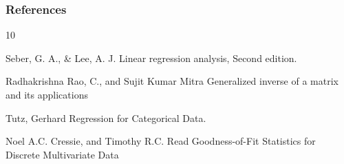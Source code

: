 \documentclass{beamer}
\begin{document}
\begin{frame}[allowframebreaks]
  \frametitle{References}    
  \begin{thebibliography}{10}    

%    
%    
    
            \beamertemplatearticlebibitems
   Seber, G. A., \& Lee, A. J.
    \newblock Linear regression analysis, Second edition.
    
    
            \beamertemplatearticlebibitems
 Radhakrishna Rao, C., and Sujit Kumar Mitra
    \newblock Generalized inverse of a matrix and its applications
    
       \beamertemplatearticlebibitems
   Tutz, Gerhard
    \newblock Regression for Categorical Data.
    
    
                \beamertemplatearticlebibitems
 Noel A.C. Cressie, and Timothy R.C. Read
    \newblock Goodness-of-Fit Statistics for Discrete Multivariate Data
  \end{thebibliography}
\end{frame}
\end{document}
